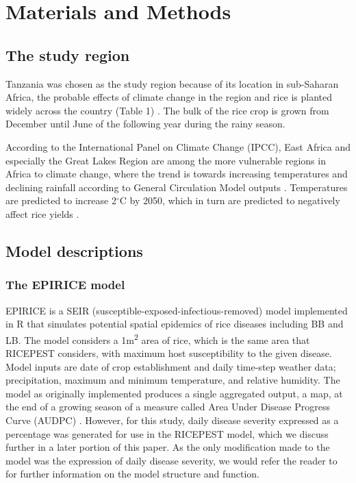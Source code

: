 \documentclass[preprint,12pt]{elsarticle}
\begin{document}
\section{Materials and Methods}


\subsection{The study region}
Tanzania was chosen as the study region because of its location in sub-Saharan Africa, the probable effects of climate change in the region and rice is planted widely across the country  (Table 1) \cite{Rowhani2011}. The bulk of the rice crop is grown from December until June of the following year during the rainy season. 

According to the International Panel on Climate Change (IPCC), East Africa and especially the Great Lakes Region are among the more vulnerable regions in Africa to climate change, where the trend is towards increasing temperatures and declining rainfall according to General Circulation Model outputs \cite{Boko2007}. Temperatures are predicted to increase 2$^{\circ}$C by 2050, which in turn are predicted to negatively affect rice yields \cite{Rowhani2011}.

\subsection{Model descriptions}
\subsubsection{The EPIRICE model} 
EPIRICE \cite{Savary2012} is a SEIR (susceptible-exposed-infectious-removed) model \cite{Kermack1927, Madden2006} implemented in R \cite{R2014} that simulates potential spatial epidemics of rice diseases including BB and LB. The model considers a 1m\textsuperscript{2} area of rice, which is the same area that RICEPEST considers, with maximum host susceptibility to the given disease. Model inputs are date of crop establishment and daily time-step weather data; precipitation, maximum and minimum temperature, and relative humidity. The model as originally implemented produces a single aggregated output, a map, at the end of a growing season of a measure called Area Under Disease Progress Curve (AUDPC) \cite{Shaner1977}. However, for this study, daily disease severity expressed as a percentage was generated for use in the RICEPEST model, which we discuss further in a later portion of this paper. As the only modification made to the model was the expression of daily disease severity, we  would refer the reader to \citet{Savary2012} for further information on the model structure and function.
\end{document}
